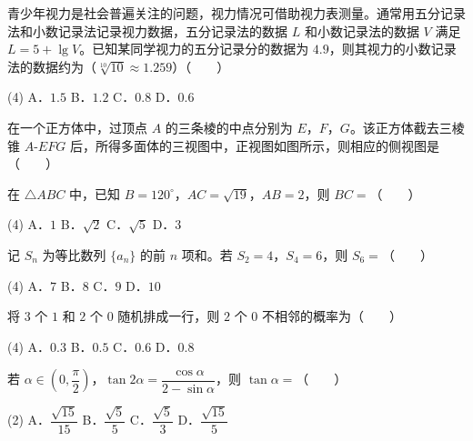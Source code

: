 \begin{question}
青少年视力是社会普遍关注的问题，视力情况可借助视力表测量。通常用五分记录法和小数记录法记录视力数据，五分记录法的数据 $L$ 和小数记录法的数据 $V$ 满足 $L=5+\lg V$。已知某同学视力的五分记录分的数据为 $4.9$，则其视力的小数记录法的数据约为（$\sqrt[10]{10}\approx1.259$）\mbox{（　　）}

\begin{gkopts}(4)
\task A．$1.5$
\task B．$1.2$
\task C．$0.8$
\task D．$0.6$
\end{gkopts}

\Needspace{0.4\textheight}
\end{question}
\begin{question}
在一个正方体中，过顶点 $A$ 的三条棱的中点分别为 $E$，$F$，$G$。该正方体截去三棱锥 $A\text{-}EFG$ 后，所得多面体的三视图中，正视图如图所示，则相应的侧视图是\mbox{（　　）}
\nopagebreak[4]
\begin{center}\end{center}
\nopagebreak[4]
\end{question}
\begin{question}
在 $\triangle ABC$ 中，已知 $B=120^\circ$，$AC=\sqrt{19}$，$AB=2$，则 $BC=$\mbox{（　　）}

\begin{gkopts}(4)
\task A．$1$
\task B．$\sqrt2$
\task C．$\sqrt5$
\task D．$3$
\end{gkopts}

\end{question}
\begin{question}
记 $S_n$ 为等比数列 $\{a_n\}$ 的前 $n$ 项和。若 $S_2=4$，$S_4=6$，则 $S_6=$\mbox{（　　）}

\begin{gkopts}(4)
\task A．$7$
\task B．$8$
\task C．$9$
\task D．$10$
\end{gkopts}

\end{question}
\begin{question}
将 $3$ 个 $1$ 和 $2$ 个 $0$ 随机排成一行，则 $2$ 个 $0$ 不相邻的概率为\mbox{（　　）}

\begin{gkopts}(4)
\task A．$0.3$
\task B．$0.5$
\task C．$0.6$
\task D．$0.8$
\end{gkopts}

\end{question}
\begin{question}
若 $\alpha\in\left(0,\dfrac\pi2\right)$，$\tan2\alpha=\dfrac{\cos\alpha}{2-\sin\alpha}$，则 $\tan\alpha=$\mbox{（　　）}

\begin{gkopts}(2)
\task A．$\dfrac{\sqrt{15}}{15}$
\task B．$\dfrac{\sqrt5}5$
\task C．$\dfrac{\sqrt5}3$
\task D．$\dfrac{\sqrt{15}}5$
\end{gkopts}

\end{question}
